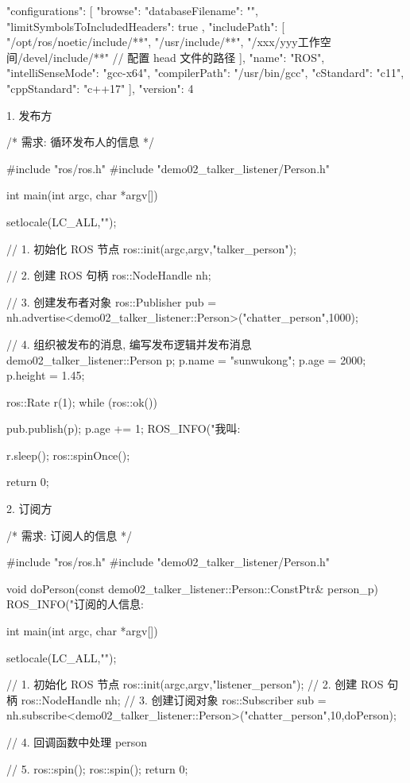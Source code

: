 \documentclass[openany, fontset=windowsold]{ctexbook}
\theoremstyle{kaiti}
\theoremstyle{normal}
\begin{document}
\begin{xml}
  {
      "configurations": [
          {
              "browse": {
                  "databaseFilename": "",
                  "limitSymbolsToIncludedHeaders": true
              },
              "includePath": [
                  "/opt/ros/noetic/include/**",
                  "/usr/include/**",
                  "/xxx/yyy工作空间/devel/include/**" // 配置 head 文件的路径 
              ],
              "name": "ROS",
              "intelliSenseMode": "gcc-x64",
              "compilerPath": "/usr/bin/gcc",
              "cStandard": "c11",
              "cppStandard": "c++17"
          }
      ],
      "version": 4
  }
\end{xml}

1. 发布方

\begin{cpp}
  /*
      需求: 循环发布人的信息
  */

  #include "ros/ros.h"
  #include "demo02_talker_listener/Person.h"

  int main(int argc, char *argv[])
  {
      setlocale(LC_ALL,"");

      // 1. 初始化 ROS 节点
      ros::init(argc,argv,"talker_person");

      // 2. 创建 ROS 句柄
      ros::NodeHandle nh;

      // 3. 创建发布者对象
      ros::Publisher pub = nh.advertise<demo02_talker_listener::Person>("chatter_person",1000);

      // 4. 组织被发布的消息, 编写发布逻辑并发布消息
      demo02_talker_listener::Person p;
      p.name = "sunwukong";
      p.age = 2000;
      p.height = 1.45;

      ros::Rate r(1);
      while (ros::ok())
      {
          pub.publish(p);
          p.age += 1;
          ROS_INFO("我叫:%

          r.sleep();
          ros::spinOnce();
      }
      return 0;
  }
\end{cpp}

2. 订阅方

\begin{cpp}
  /*
      需求: 订阅人的信息
  */

  #include "ros/ros.h"
  #include "demo02_talker_listener/Person.h"

  void doPerson(const demo02_talker_listener::Person::ConstPtr& person_p){
      ROS_INFO("订阅的人信息:%
  }

  int main(int argc, char *argv[])
  {   
      setlocale(LC_ALL,"");

      // 1. 初始化 ROS 节点
      ros::init(argc,argv,"listener_person");
      // 2. 创建 ROS 句柄
      ros::NodeHandle nh;
      // 3. 创建订阅对象
      ros::Subscriber sub = nh.subscribe<demo02_talker_listener::Person>("chatter_person",10,doPerson);

      // 4. 回调函数中处理 person

      // 5. ros::spin();
      ros::spin();    
      return 0;
  }
\end{cpp}
\end{document}
